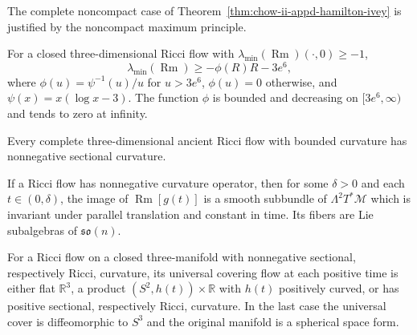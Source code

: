 \begin{remark}
\label{rem:chow-ii-appd-hamilton-ivey-noncompact}
The complete noncompact case of Theorem~\ref{thm:chow-ii-appd-hamilton-ivey}
is justified by the noncompact maximum principle.
\end{remark}

\begin{corollary}
\label{cor:chow-ii-appd-almost-nonnegative-curvature}
For a closed three-dimensional Ricci flow with
$\lambda_{\min}(\operatorname{Rm})(\cdot,0)\geq-1$,
\[
 \lambda_{\min}(\operatorname{Rm})\geq-\phi(R)R-3e^6,
\]
where $\phi(u)=\psi^{-1}(u)/u$ for $u>3e^6$, $\phi(u)=0$ otherwise, and
$\psi(x)=x(\log x-3)$. The function $\phi$ is bounded and decreasing on
$[3e^6,\infty)$ and tends to zero at infinity.
\end{corollary}

\begin{lemma}
\label{lem:chow-ii-appd-ancient-three-dimensional-nonnegative}
Every complete three-dimensional ancient Ricci flow with bounded curvature
has nonnegative sectional curvature.
\end{lemma}

\begin{theorem}
\label{thm:chow-ii-appd-curvature-operator-strong-maximum-principle}
If a Ricci flow has nonnegative curvature operator, then for some $\delta>0$
and each $t\in(0,\delta)$, the image of $\operatorname{Rm}[g(t)]$ is a smooth
subbundle of $\Lambda^2T^*\mathcal M$ which is invariant under parallel
translation and constant in time. Its fibers are Lie subalgebras of
$\mathfrak{so}(n)$.
\end{theorem}

\begin{theorem}
\label{thm:chow-ii-appd-three-manifold-curvature-rigidity}
For a Ricci flow on a closed three-manifold with nonnegative sectional,
respectively Ricci, curvature, its universal covering flow at each positive
time is either flat $\mathbb R^3$, a product $(S^2,h(t))\times\mathbb R$ with
$h(t)$ positively curved, or has positive sectional, respectively Ricci,
curvature. In the last case the universal cover is diffeomorphic to $S^3$ and
the original manifold is a spherical space form.
\end{theorem}

